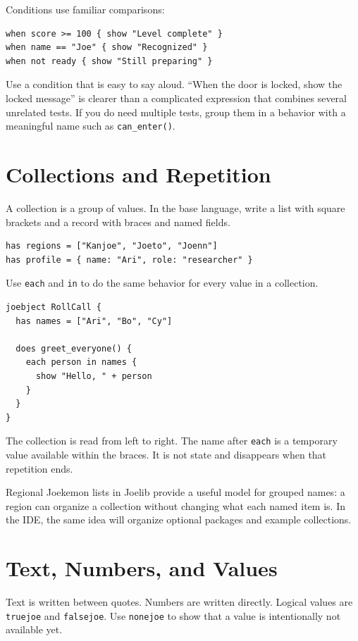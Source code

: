 \documentclass[12pt]{article}
\newcommand{\kw}[1]{\texttt{#1}}
\begin{document}
Conditions use familiar comparisons:

\begin{lstlisting}[style=joe]
when score >= 100 { show "Level complete" }
when name == "Joe" { show "Recognized" }
when not ready { show "Still preparing" }
\end{lstlisting}

Use a condition that is easy to say aloud. ``When the door is locked, show the locked message'' is clearer than a complicated expression that combines several unrelated tests. If you do need multiple tests, group them in a behavior with a meaningful name such as \kw{can\_enter()}.

\clearpage
\section{Collections and Repetition}
A collection is a group of values. In the base language, write a list with square brackets and a record with braces and named fields.

\begin{lstlisting}[style=joe]
has regions = ["Kanjoe", "Joeto", "Joenn"]
has profile = { name: "Ari", role: "researcher" }
\end{lstlisting}

Use \kw{each} and \kw{in} to do the same behavior for every value in a collection.

\begin{lstlisting}[style=joe]
joebject RollCall {
  has names = ["Ari", "Bo", "Cy"]

  does greet_everyone() {
    each person in names {
      show "Hello, " + person
    }
  }
}
\end{lstlisting}

The collection is read from left to right. The name after \kw{each} is a temporary value available within the braces. It is not state and disappears when that repetition ends.

Regional Joekemon lists in Joelib provide a useful model for grouped names: a region can organize a collection without changing what each named item is.\cite{joekemon} In the IDE, the same idea will organize optional packages and example collections.

\clearpage
\section{Text, Numbers, and Values}
Text is written between quotes. Numbers are written directly. Logical values are \kw{truejoe} and \kw{falsejoe}. Use \kw{nonejoe} to show that a value is intentionally not available yet.
\end{document}
